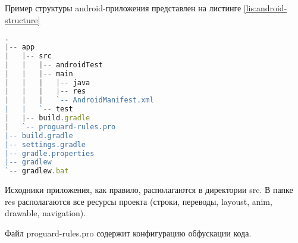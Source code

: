 Пример структуры android-приложения представлен на листинге \ref{lis:android-structure}

\begin{lstlisting}[language=TypeScript, captionpos=b,
label={lis:android-structure},
caption={Пример структуры Android приложения}
]
.
|-- app
|   |-- src
|   |   |-- androidTest
|   |   |-- main
|   |   |   |-- java
|   |   |   |-- res
|   |   |   `-- AndroidManifest.xml
|   |   `-- test
|   |-- build.gradle
|   `-- proguard-rules.pro
|-- build.gradle
|-- settings.gradle
|-- gradle.properties
|-- gradlew
`-- gradlew.bat
\end{lstlisting}

Исходники приложения, как правило, располагаются в директории src. В папке res располагаются все ресурсы проекта (строки, переводы, layoust, anim, drawable, navigation).

Файл proguard-rules.pro содержит конфигурацию обфускации кода.
